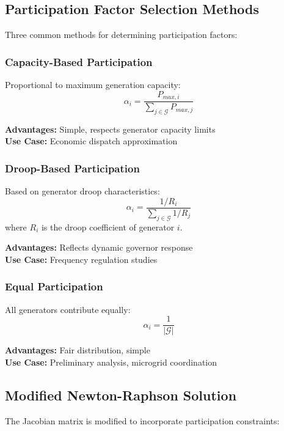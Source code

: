\documentclass[11pt]{article}
\begin{document}
\subsection{Participation Factor Selection Methods}

Three common methods for determining participation factors:

\subsubsection{Capacity-Based Participation}
Proportional to maximum generation capacity:
\begin{equation}
\alpha_i = \frac{P_{max,i}}{\sum_{j \in \mathcal{G}} P_{max,j}}
\end{equation}

\textbf{Advantages:} Simple, respects generator capacity limits\\
\textbf{Use Case:} Economic dispatch approximation

\subsubsection{Droop-Based Participation}
Based on generator droop characteristics:
\begin{equation}
\alpha_i = \frac{1/R_i}{\sum_{j \in \mathcal{G}} 1/R_j}
\end{equation}
where $R_i$ is the droop coefficient of generator $i$.

\textbf{Advantages:} Reflects dynamic governor response\\
\textbf{Use Case:} Frequency regulation studies

\subsubsection{Equal Participation}
All generators contribute equally:
\begin{equation}
\alpha_i = \frac{1}{|\mathcal{G}|}
\end{equation}

\textbf{Advantages:} Fair distribution, simple\\
\textbf{Use Case:} Preliminary analysis, microgrid coordination

\subsection{Modified Newton-Raphson Solution}

The Jacobian matrix is modified to incorporate participation constraints:
\end{document}
